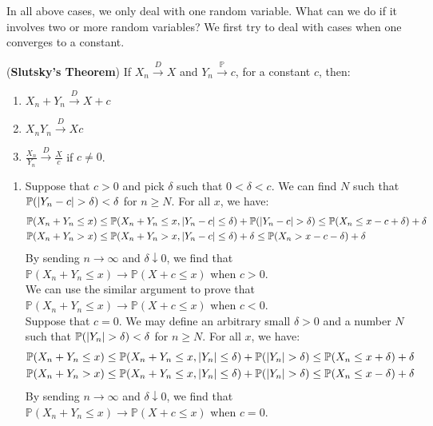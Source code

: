 \documentclass{huhtakm-template-book}
\newcommand{\prob}{\mathbb{P}}
\begin{document}
\newpage
In all above cases, we only deal with one random variable. What can we do if it involves two or more random variables? We first try to deal with cases when one converges to a constant.
\begin{thm}(\textbf{Slutsky's Theorem})
	If $X_{n}\xrightarrow{D}X$ and $Y_{n}\xrightarrow{\prob}c$, for a constant $c$, then:
	\begin{enumerate}
		\item $X_{n}+Y_{n}\xrightarrow{D}X+c$
		\item $X_{n}Y_{n}\xrightarrow{D}Xc$
		\item $\frac{X_{n}}{Y_{n}}\xrightarrow{D}\frac{X}{c}$ if $c\neq 0$.
	\end{enumerate}
\end{thm}
\begin{proofing}
	\begin{enumerate}
		\item Suppose that $c>0$ and pick $\delta$ such that $0<\delta<c$. We can find $N$ such that $\prob(\abs{Y_{n}-c}>\delta)<\delta$ for $n\geq N$. For all $x$, we have:
		\begin{align*}
			\prob(X_{n}+Y_{n}\leq x)&\leq\prob(X_{n}+Y_{n}\leq x,\abs{Y_{n}-c}\leq\delta)+\prob(\abs{Y_{n}-c}>\delta)\leq\prob(X_{n}\leq x-c+\delta)+\delta\\
			\prob(X_{n}+Y_{n}>x)&\leq\prob(X_{n}+Y_{n}>x,\abs{Y_{n}-c}\leq\delta)+\delta\leq\prob(X_{n}>x-c-\delta)+\delta
		\end{align*}
		By sending $n\to\infty$ and $\delta\downarrow 0$, we find that $\prob(X_{n}+Y_{n}\leq x)\to\prob(X+c\leq x)$ when $c>0$.\\
		We can use the similar argument to prove that $\prob(X_{n}+Y_{n}\leq x)\to\prob(X+c\leq x)$ when $c<0$.\\
		Suppose that $c=0$. We may define an arbitrary small $\delta>0$ and a number $N$ such that $\prob(\abs{Y_{n}}>\delta)<\delta$ for $n\geq N$. For all $x$, we have:
		\begin{align*}
			\prob(X_{n}+Y_{n}\leq x)&\leq\prob(X_{n}+Y_{n}\leq x,\abs{Y_{n}}\leq\delta)+\prob(\abs{Y_{n}}>\delta)\leq\prob(X_{n}\leq x+\delta)+\delta\\
			\prob(X_{n}+Y_{n}>x)&\leq\prob(X_{n}+Y_{n}\leq x,\abs{Y_{n}}\leq\delta)+\prob(\abs{Y_{n}}>\delta)\leq\prob(X_{n}\leq x-\delta)+\delta
		\end{align*}
		By sending $n\to\infty$ and $\delta\downarrow 0$, we find that $\prob(X_{n}+Y_{n}\leq x)\to\prob(X+c\leq x)$ when $c=0$.\\

\end{enumerate}
\end{proofing}
\end{document}

